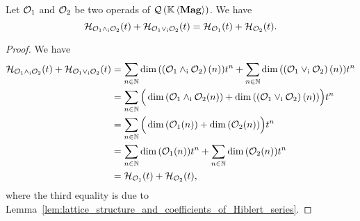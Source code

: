 \begin{Theorem}
    \label{thm:Grassmann_formula_for_Hilbert_series_of_QMag}
    Let $\mathcal{O}_1$ and $\mathcal{O}_2$ be two operads of $\mathcal{Q}\left(\mathbb{K} \left\langle\mathbf{Mag}\right\rangle\right)$. We have
    \begin{equation} \label{equ:lattice_structure_and_Hiblert_series}
        \mathcal{H}_{\mathcal{O}_1\wedge_{\mathrm{i}}\mathcal{O}_2}(t)
        +\mathcal{H}_{\mathcal{O}_1\vee_{\mathrm{i}}\mathcal{O}_2}(t)
        =\mathcal{H}_{\mathcal{O}_1}(t)+\mathcal{H}_{\mathcal{O}_2}(t).
    \end{equation}
\end{Theorem}
\begin{proof}
    We have
    \begin{equation}\begin{split}
        \mathcal{H}_{\mathcal{O}_1\wedge_{\mathrm{i}}\mathcal{O}_2}(t)
        +\mathcal{H}_{\mathcal{O}_1\vee_{\mathrm{i}}\mathcal{O}_2}(t)&
        =\sum_{n\in\mathbb{N}}\dim{\left(\left(\mathcal{O}_1\wedge_{\mathrm{i}}\mathcal{O}_2\right)(n)
            \right)}t^n
            +\sum_{n\in\mathbb{N}}\dim{\left(\left(\mathcal{O}_1\vee_{\mathrm{i}}\mathcal{O}_2\right)
            (n)\right)}t^n\\
        &=\sum_{n\in\mathbb{N}}\Big(\dim{\left(\mathcal{O}_1\wedge_{\mathrm{i}}\mathcal{O}_2(n)\right)}
            +\dim{\left(\left(\mathcal{O}_1\vee_{\mathrm{i}}\mathcal{O}_2\right)(n)
        \right)}\Big)t^n\\
        &=\sum_{n\in\mathbb{N}}\Big(\dim{\left(\mathcal{O}_1(n)\right)}
            +\dim{\left(\mathcal{O}_2(n)\right)}\Big)t^n\\
        &=\sum_{n\in\mathbb{N}}\dim{\left(\mathcal{O}_1(n)\right)}t^n+\sum_{n\in\mathbb{N}}
            \dim{\left(\mathcal{O}_2(n)\right)}t^n\\
        &=\mathcal{H}_{\mathcal{O}_1}(t)+\mathcal{H}_{\mathcal{O}_2}(t),
    \end{split}\end{equation}
    where the third equality is due to
    Lemma~\ref{lem:lattice_structure_and_coefficients_of_Hiblert_series}.
\end{proof}
\medbreak
